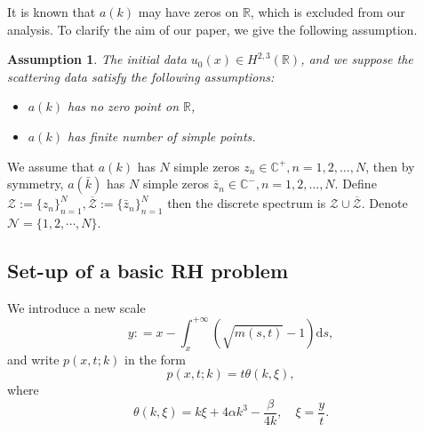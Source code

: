 \documentclass[11pt]{article}
\numberwithin{equation}{section}
\newtheorem{Assumption}{Assumption}
\begin{document}
It is known that $a(k)$ may have zeros on $\mathbb{R}$, which is excluded from our analysis. To clarify the aim of our paper, we give the following assumption.

 \begin{Assumption}\label{a1}
     The initial data $u_0(x)\in H^{2,3}(\mathbb{R})$, and we suppose the scattering data satisfy the following assumptions:
     \begin{itemize}
         \item $a(k)$ has no zero point on $\mathbb{R}$,
         \item $a(k)$ has finite number of simple points.
     \end{itemize}
 \end{Assumption}
 We assume that $a(k)$ has $N$ simple zeros $z_n\in\mathbb{C}^+,n=1,2,\dots,N$, then by symmetry, $a(\bar{k})$ has $N$ simple zeros $\bar{z}_n\in\mathbb{C}^-,n=1,2,\dots,N$. Define $\mathcal{Z}:=\{z_n\}_{n=1}^N,\overline{\mathcal{Z}}:=\{\bar{z}_n\}_{n=1}^N$ then the discrete spectrum is $\mathcal{Z}\cup\overline{\mathcal{Z}}$.  Denote  $\mathcal{N}= \{1,2,\cdots,N\}$.




\subsection{Set-up of a basic RH problem}\label{subs2.3}
\quad  We introduce a new  scale
\begin{equation}
y: =x-\int_x^{+\infty}(\sqrt{m(s,t)}-1)\mathrm{d}s,\label{xtoy}
\end{equation}
and write  $p(x,t;k)$  in the form
\begin{equation}
 p(x,t;k)=t\theta(k,\xi),
\end{equation}
where
\begin{equation}
\theta(k,\xi)=k\xi+4\alpha k^3-\frac{\beta}{4k},\quad \xi=\frac{y}{t}. \label{thetak}
\end{equation}
\end{document}
